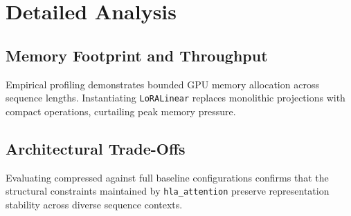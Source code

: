 \section{Detailed Analysis}

\subsection{Memory Footprint and Throughput}
Empirical profiling demonstrates bounded GPU memory allocation across sequence lengths. Instantiating \texttt{LoRALinear} replaces monolithic projections with compact operations, curtailing peak memory pressure.

\subsection{Architectural Trade-Offs}
Evaluating compressed against full baseline configurations confirms that the structural constraints maintained by \texttt{hla_attention} preserve representation stability across diverse sequence contexts.
